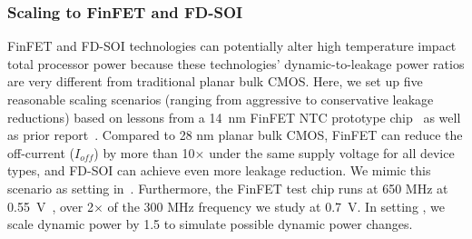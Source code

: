 \subsubsection{Scaling to FinFET and FD-SOI}

\begin{table}[t]
\centering
{}
  \caption{FinFET and FD-SOI scaling settings: for completeness, we scale dynamic and leakage power with different factors to cover both aggressive and conservative scenarios.} 
  \label{table:scaling-setting} 
\end{table}

FinFET and FD-SOI technologies can potentially alter high temperature impact total processor power because these technologies' dynamic-to-leakage power ratios are very different from traditional planar bulk CMOS. Here, we set up five reasonable scaling scenarios (ranging from aggressive to conservative leakage reductions) based on lessons from a 14~nm FinFET NTC prototype chip~\cite{rachala2016amdntc} as well as prior report~\cite{pelloux2012planar}. Compared to 28 nm planar bulk CMOS, FinFET can reduce the off-current ($I_{off}$) by more than 10$\times$ under the same supply voltage for all device types, and FD-SOI can achieve even more leakage reduction. We mimic this scenario as setting  in~. Furthermore, the FinFET test chip runs at 650 MHz at 0.55~V~\cite{rachala2016amdntc}, over 2$\times$ of the 300 MHz frequency we study at 0.7~V. In setting , we scale dynamic power by 1.5 to simulate possible dynamic power changes.

